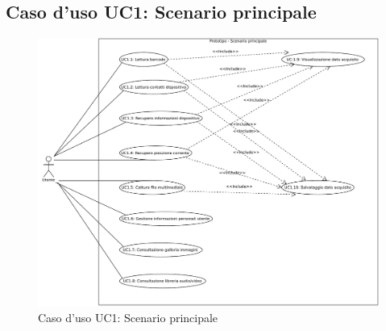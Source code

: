 \subsection{Caso d'uso UC1: Scenario principale}
\begin{figure}[htb]
\centering
\includegraphics[scale=0.45]{gfx/useCase/UC1_Scenario_principale.pdf}
\caption{Caso d'uso UC1: Scenario principale}
\label{fig:UC1}
\end{figure}

